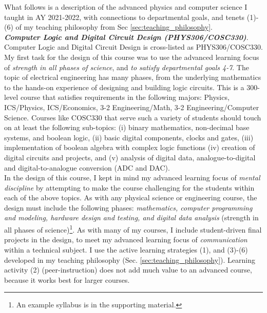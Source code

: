 \documentclass[../../../main.tex]{subfiles}
\begin{document}
What follows is a description of the advanced physics and computer science I taught in AY 2021-2022, with connections to departmental goals, and tenets (1)-(6) of my teaching philosophy from Sec \ref{sec:teaching_philosophy}.
\\
\vspace{0.15cm}
\textbf{\textit{Computer Logic and Digital Circuit Design (PHYS306/COSC330)}}. Computer Logic and Digital Circuit Design is cross-listed as PHYS306/COSC330.  My first task for the design of this course was to use the advanced learning focus of \textit{strength in all phases of science}, and \textit{to satisfy departmental goals 4-7}.  The topic of electrical engineering has many phases, from the underlying mathematics to the hands-on experience of designing and building logic circuits.  This is a 300-level course that satisfies requirements in the following majors: Physics, ICS/Physics, ICS/Economics, 3-2 Engineering/Math, 3-2 Engineering/Computer Science.  Courses like COSC330 that serve such a variety of students should touch on at least the following sub-topics: (i) binary mathematics, non-decimal base systems, and boolean logic, (ii) basic digital components, clocks and gates, (iii) implementation of boolean algebra with complex logic functions (iv) creation of digital circuits and projects, and (v) analysis of digital data, analogue-to-digital and digital-to-analogue conversion (ADC and DAC).
\\
\vspace{0.15cm}
In the design of this course, I kept in mind my advanced learning focus of \textit{mental discipline} by attempting to make the course challenging for the students within each of the above topics.  As with any physical science or engineering course, the design must include the following phases: \textit{mathematics, computer programming and modeling, hardware design and testing, and digital data analysis} (strength in all phases of science)\footnote{An example syllabus is in the supporting material.}.  As with many of my courses, I include student-driven final projects in the design, to meet my advanced learning focus of \textit{communication} within a technical subject.  I use the active learning strategies (1), and (3)-(6) developed in my teaching philosophy (Sec. \ref{sec:teaching_philosophy}).  Learning activity (2) (peer-instruction) does not add much value to an advanced course, because it works best for larger courses.
\\
\vspace{0.15cm}
\end{document}
